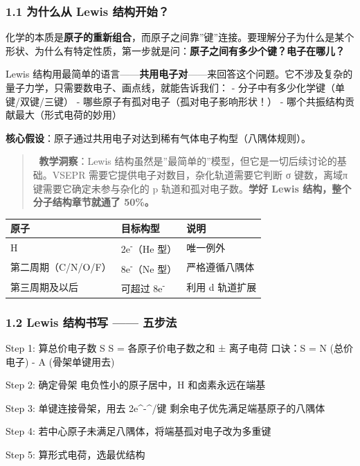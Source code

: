 \documentclass[a4paper,11pt]{ctexart}
\newenvironment{Shaded}{}{}
\newenvironment{Highlighting}{}{}
\newcommand{\NormalTok}[1]{#1}
\newcounter{none}
\begin{document}
\subsubsection{1.1 为什么从 Lewis 结构开始？}\label{ux4e3aux4ec0ux4e48ux4ece-lewis-ux7ed3ux6784ux5f00ux59cb}

化学的本质是\textbf{原子的重新组合}，而原子之间靠''键''连接。要理解分子为什么是某个形状、为什么有特定性质，第一步就是问：\textbf{原子之间有多少个键？电子在哪儿？}

Lewis 结构用最简单的语言------\textbf{共用电子对}------来回答这个问题。它不涉及复杂的量子力学，只需要数电子、画点线，就能告诉我们：
- 分子中有多少化学键（单键/双键/三键）
- 哪些原子有孤对电子（孤对电子影响形状！）
- 哪个共振结构贡献最大（形式电荷的妙用）

\textbf{核心假设}：原子通过共用电子对达到稀有气体电子构型（八隅体规则）。

\begin{quote}
🧠 \textbf{教学洞察}：Lewis 结构虽然是''最简单的''模型，但它是一切后续讨论的基础。VSEPR 需要它提供电子对数目，杂化轨道需要它判断 σ 键数，离域π键需要它确定未参与杂化的 p 轨道和孤对电子数。\textbf{学好 Lewis 结构，整个分子结构章节就通了 50\%。}
\end{quote}

{\def\LTcaptype{none} %
\begin{longtable}[]{@{}lll@{}}
\toprule\noalign{}
原子 & 目标构型 & 说明 \\
\midrule\noalign{}
\endhead
\bottomrule\noalign{}
\endlastfoot
H & 2e\textsuperscript{-}（He 型） & 唯一例外 \\
第二周期（C/N/O/F） & 8e\textsuperscript{-}（Ne 型） & 严格遵循八隅体 \\
第三周期及以后 & 可超过 8e\textsuperscript{-} & 利用 d 轨道扩展 \\
\end{longtable}
}

\subsubsection{1.2 Lewis 结构书写 ------ 五步法}\label{lewis-ux7ed3ux6784ux4e66ux5199-ux4e94ux6b65ux6cd5}

\begin{Shaded}
\begin{Highlighting}[]
\NormalTok{Step 1: 算总价电子数 S}
\NormalTok{  S = 各原子价电子数之和 ± 离子电荷}
\NormalTok{  口诀：S = N (总价电子) {-} A (骨架单键用去)}

\NormalTok{Step 2: 确定骨架}
\NormalTok{  电负性小的原子居中，H 和卤素永远在端基}

\NormalTok{Step 3: 单键连接骨架，用去 2e\^{}{-}\^{}/键}
\NormalTok{  剩余电子优先满足端基原子的八隅体}

\NormalTok{Step 4: 若中心原子未满足八隅体，将端基孤对电子改为多重键}

\NormalTok{Step 5: 算形式电荷，选最优结构}
\end{Highlighting}
\end{Shaded}
\end{document}
